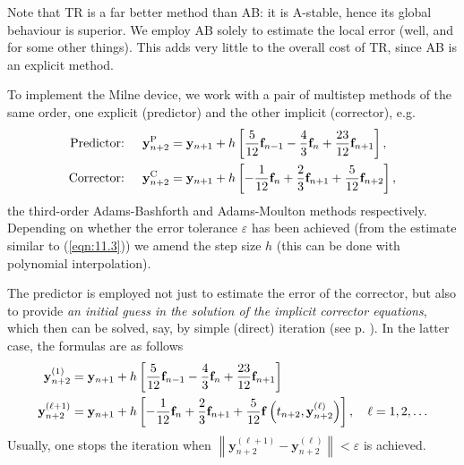 \documentclass[a4paper]{article}
\renewcommand{\epsilon}{\varepsilon}
\begin{document}
Note that TR is a far better method than AB: it is A-stable, hence its global behaviour is superior. We employ $\mathrm{AB}$ solely to estimate the local error (well, and for some other things). This adds very little to the overall cost of TR, since AB is an explicit method.

\begin{implementation}
    To implement the Milne device, we work with a pair of multistep methods of the same order, one explicit (predictor) and the other implicit (corrector), e.g.
    \begin{align}
        \text {Predictor: }\quad & {\bf y}_{n+2}^{\mathrm{P}}=\mathbf{y}_{n+1}+h\left[\frac{5}{12} {\bf f}_{n-1}-\frac{4}{3} {\bf f}_n+\frac{23}{12} {\bf f}_{n+1}\right], \nonumber\\
    \text {Corrector: }\quad & {\bf y}_{n+2}^{\mathrm{C}}=\mathbf{y}_{n+1}+h\left[-\frac{1}{12} {\bf f}_n+\frac{2}{3} {\bf f}_{n+1}+\frac{5}{12} {\bf f}_{n+2}\right],\label{eqn:11.4}
    \end{align}
    the third-order Adams-Bashforth and Adams-Moulton methods respectively. Depending on whether the error tolerance $\epsilon$ has been achieved (from the estimate similar to (\ref{eqn:11.3})) we amend the step size $h$ (this can be done with polynomial interpolation).
\end{implementation}

The predictor is employed not just to estimate the error of the corrector, but also to provide \textit{an initial guess in the solution of the implicit corrector equations}, which then can be solved, say, by simple (direct) iteration (see p. \pageref{def:theta_methods}). In the latter case, the formulas are as follows
\begin{align}
    \mathbf{y}_{n+2}^{(1)} & =\mathbf{y}_{n+1}+h\left[\frac{5}{12} {\bf f}_{n-1}-\frac{4}{3} {\bf f}_n+\frac{23}{12} {\bf f}_{n+1}\right] \label{eqn:11.5} \\
    \mathbf{y}_{n+2}^{(\ell+1)} &=\mathbf{y}_{n+1}+h\left[-\frac{1}{12} {\bf f}_n+\frac{2}{3} {\bf f}_{n+1}+\frac{5}{12} {\bf f}\left(t_{n+2}, \mathbf{y}_{n+2}^{(\ell)}\right)\right], \quad \ell=1,2, \ldots \label{eqn:11.6}
\end{align}
Usually, one stops the iteration when $\left\|\mathbf{y}_{n+2}^{(\ell+1)}-\mathbf{y}_{n+2}^{(\ell)}\right\|<\epsilon$ is achieved.
\end{document}
